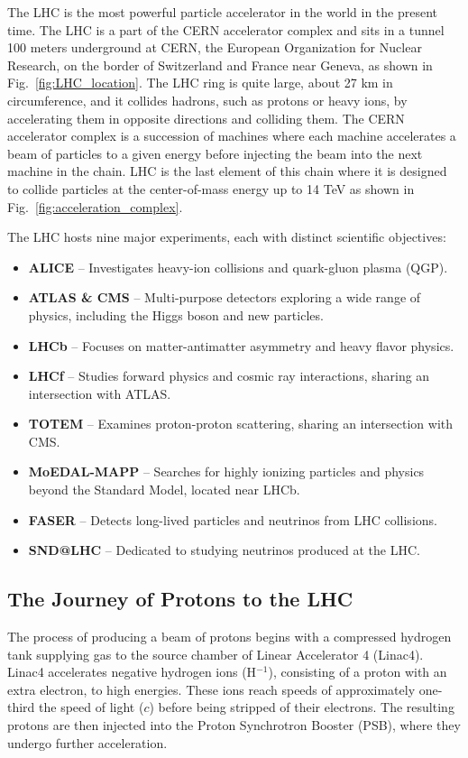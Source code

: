 
The LHC is the most powerful particle accelerator in the world in the present time.
The LHC is a part of the CERN accelerator complex and sits in a tunnel 100 meters underground at CERN, the European Organization for Nuclear Research, on the border of Switzerland and France near Geneva, as shown in Fig.~\ref{fig:LHC_location}.
The LHC ring is quite large, about 27 km in circumference, and it collides hadrons, such as protons or heavy ions, by accelerating them in opposite directions and colliding them.
The CERN accelerator complex is a succession of machines where each machine accelerates a beam of particles to a given energy before injecting the beam into the next machine in the chain.
LHC is the last element of this chain where it is designed to collide particles at the center-of-mass energy up to 14 TeV as shown in Fig.~\ref{fig:acceleration_complex}.

The LHC hosts nine major experiments, each with distinct scientific objectives:
\begin{itemize}
\item {\bf ALICE} – Investigates heavy-ion collisions and quark-gluon plasma (QGP).
\item {\bf ATLAS \& CMS} – Multi-purpose detectors exploring a wide range of physics, including the Higgs boson and new particles.
\item {\bf LHCb} – Focuses on matter-antimatter asymmetry and heavy flavor physics.
\item {\bf LHCf} – Studies forward physics and cosmic ray interactions, sharing an intersection with ATLAS.
\item {\bf TOTEM} – Examines proton-proton scattering, sharing an intersection with CMS.
\item {\bf MoEDAL-MAPP} – Searches for highly ionizing particles and physics beyond the Standard Model, located near LHCb.
\item {\bf FASER} – Detects long-lived particles and neutrinos from LHC collisions.
\item {\bf SND@LHC} – Dedicated to studying neutrinos produced at the LHC.
\end{itemize}

\subsection{The Journey of Protons to the LHC}
The process of producing a beam of protons begins with a compressed hydrogen tank supplying gas to the source chamber of Linear Accelerator 4 (Linac4).
Linac4 accelerates negative hydrogen ions (H$^{-1}$), consisting of a proton with an extra electron, to high energies.
These ions reach speeds of approximately one-third the speed of light ($c$) before being stripped of their electrons.
The resulting protons are then injected into the Proton Synchrotron Booster (PSB), where they undergo further acceleration.

